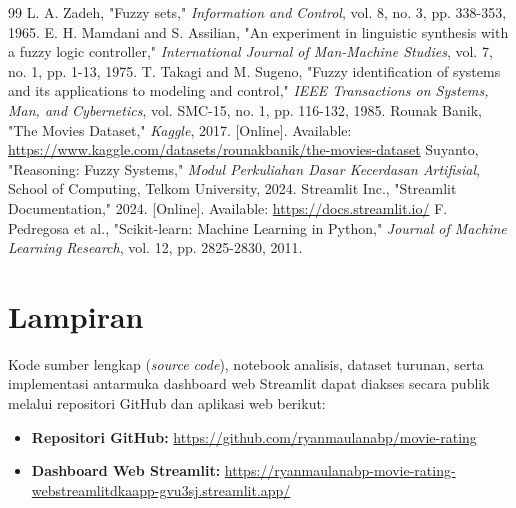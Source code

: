 \documentclass[11pt,a4paper]{article}
\begin{document}
\begin{thebibliography}{99}
 L. A. Zadeh, "Fuzzy sets," \textit{Information and Control}, vol. 8, no. 3, pp. 338-353, 1965.
 E. H. Mamdani and S. Assilian, "An experiment in linguistic synthesis with a fuzzy logic controller," \textit{International Journal of Man-Machine Studies}, vol. 7, no. 1, pp. 1-13, 1975.
 T. Takagi and M. Sugeno, "Fuzzy identification of systems and its applications to modeling and control," \textit{IEEE Transactions on Systems, Man, and Cybernetics}, vol. SMC-15, no. 1, pp. 116-132, 1985.
 Rounak Banik, "The Movies Dataset," \textit{Kaggle}, 2017. [Online]. Available: \url{https://www.kaggle.com/datasets/rounakbanik/the-movies-dataset}
 Suyanto, "Reasoning: Fuzzy Systems," \textit{Modul Perkuliahan Dasar Kecerdasan Artifisial}, School of Computing, Telkom University, 2024.
 Streamlit Inc., "Streamlit Documentation," 2024. [Online]. Available: \url{https://docs.streamlit.io/}
 F. Pedregosa et al., "Scikit-learn: Machine Learning in Python," \textit{Journal of Machine Learning Research}, vol. 12, pp. 2825-2830, 2011.
\end{thebibliography}

\section*{Lampiran}
Kode sumber lengkap (\textit{source code}), notebook analisis, dataset turunan, serta implementasi antarmuka dashboard web Streamlit dapat diakses secara publik melalui repositori GitHub dan aplikasi web berikut:
\begin{itemize}
    \item \textbf{Repositori GitHub:} \url{https://github.com/ryanmaulanabp/movie-rating}
    \item \textbf{Dashboard Web Streamlit:} \url{https://ryanmaulanabp-movie-rating-webstreamlitdkaapp-gvu3sj.streamlit.app/}
\end{itemize}
\end{document}
